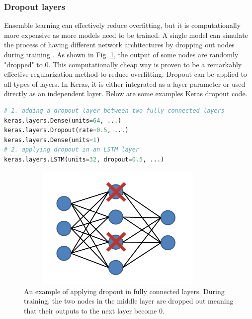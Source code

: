 \subsubsection{Dropout layers}
Ensemble learning can effectively reduce overfitting, but it is computationally more expensive as more models need to be trained. A single model can simulate the process of having different network architectures by dropping out nodes during training \cite{srivastava2014dropout}. As shown in Fig. \ref{fig_dropout}, the output of some nodes are randomly "dropped" to 0. This computationally cheap way is proven to be a remarkably effective regularization method to reduce overfitting. Dropout can be applied to all types of layers. In Keras, it is either integrated as a layer parameter or used directly as an independent layer. Below are some examples Keras dropout code.
\begin{lstlisting}[language=python,frame=single]
# 1. adding a dropout layer between two fully connected layers
keras.layers.Dense(units=64, ...)
keras.layers.Dropout(rate=0.5, ...)
keras.layers.Dense(units=1)
# 2. applying dropout in an LSTM layer
keras.layers.LSTM(units=32, dropout=0.5, ...)
\end{lstlisting}
\begin{figure}[h!]
\begin{center}
\includegraphics[height = 6cm, width = 10cm]{img/dropout.png}
\caption[An example of applying dropout in fully connected layers]{An example of applying dropout in fully connected layers. During training, the two nodes in the middle layer are dropped out meaning that their outputs to the next layer become 0. \label{fig_dropout}}
\end{center}
\end{figure}

